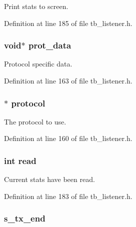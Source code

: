Print stats to screen. 



Definition at line 185 of file tb\-\_\-listener.\-h.

\hypertarget{structtb__listener__t_ab79822e20d19ce95bdf8a3f95bd616d5}{
\subsubsection[{prot\-\_\-data}]{\setlength{\rightskip}{0pt plus 5cm}void$\ast$ prot\-\_\-data}}\label{structtb__listener__t_ab79822e20d19ce95bdf8a3f95bd616d5}


Protocol specific data. 



Definition at line 163 of file tb\-\_\-listener.\-h.

\hypertarget{structtb__listener__t_a0b0f6789be37cb22fa42abe30a271591}{
\subsubsection[{protocol}]{$\ast$ protocol}}\label{structtb__listener__t_a0b0f6789be37cb22fa42abe30a271591}


The protocol to use. 



Definition at line 160 of file tb\-\_\-listener.\-h.

\hypertarget{structtb__listener__t_ad91878c8e805d88354749a9fbfee4296}{
\subsubsection[{read}]{\setlength{\rightskip}{0pt plus 5cm}int read}}\label{structtb__listener__t_ad91878c8e805d88354749a9fbfee4296}


Current stats have been read. 



Definition at line 183 of file tb\-\_\-listener.\-h.

\hypertarget{structtb__listener__t_aea40caaca885ba5ed3e0b82d7ef1f498}{
\subsubsection[{s\-\_\-tx\-\_\-end}]{ s\-\_\-tx\-\_\-end}}\label{structtb__listener__t_aea40caaca885ba5ed3e0b82d7ef1f498}


